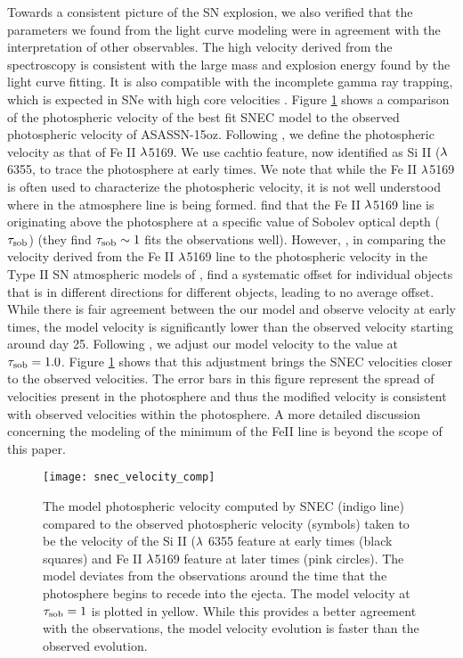 \documentclass[a4paper,fleqn,usenatbib]{mnras}
\begin{document}
Towards a consistent picture of the SN explosion, we also verified that the parameters we found from the light curve modeling were in agreement with the interpretation of other observables.
The high velocity derived from the spectroscopy is consistent with the large mass and explosion energy found by the light curve fitting.
It is also compatible with the incomplete gamma ray trapping, which is expected in SNe with high core velocities \citep{2011jerkstrand}.
Figure \ref{fig:SNECVelocityCompare} shows a comparison of the photospheric velocity of the best fit SNEC model to the observed photospheric velocity of ASASSN-15oz.
Following \citet{2014faran}, we define the photospheric velocity as that of Fe II $\rm{\lambda}$5169. 
We use cachtio feature, now identified as Si II ($\rm{\lambda}$ 6355, to trace the photosphere at early times.
We note that while the Fe II $\rm{\lambda}$5169 is often used to characterize the photospheric velocity, it is not well understood where in the atmosphere line is being formed. 
\citet{2018paxton} find that the Fe II $\rm{\lambda}$5169 line is originating above the photosphere at a specific value of Sobolev optical depth ($\rm{\tau_{sob}}$) (they find $\rm{\tau_{sob} \sim1}$ fits the observations well).
However, \citet{2001hamuy}, in comparing the velocity derived from the Fe II $\rm{\lambda}$5169 line to the photospheric velocity in the Type II SN atmospheric models of \citet{1996eastman}, find a systematic offset for individual objects that is in different directions for different objects, leading to no average offset. 
While there is fair agreement between the our model and observe velocity at early times, the model velocity is significantly lower than the observed velocity starting around day 25.
Following \citet{2018paxton}, we adjust our model velocity to the value at $\rm{\tau_{sob} = 1.0}$. 
Figure \ref{fig:SNECVelocityCompare} shows that this adjustment brings the SNEC velocities closer to the observed velocities.
The error bars in this figure represent the spread of velocities present in the photosphere and thus the modified velocity is consistent with observed velocities within the photosphere. 
A more detailed discussion concerning the modeling of the minimum of the FeII line is beyond the scope of this paper.
\begin{figure}
\begin{center}
\texttt{[image: snec\_velocity\_comp]} %
\caption{The model photospheric velocity computed by SNEC (indigo line) compared to the observed photospheric velocity (symbols) taken to be the velocity of the Si II ($\rm{\lambda}$ 6355 feature at early times (black squares) and Fe II $\rm{\lambda}$5169 feature at later times (pink circles). 
The model deviates from the observations around the time that the photosphere begins to recede into the ejecta.
The model velocity at $\rm{\tau_{sob}=1}$ is plotted in yellow. 
While this provides a better agreement with the observations, the model velocity evolution is faster than the observed evolution.
}
\label{fig:SNECVelocityCompare}
\end{center}
\end{figure}
\end{document}
